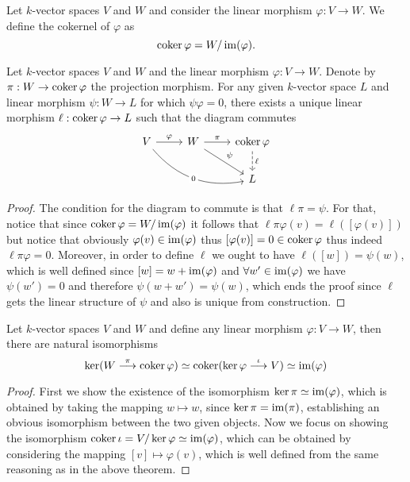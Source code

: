 \begin{definition}[Cokernel]
Let \(k\)-vector spaces \(V\) and \(W\) and consider the linear morphism
\(\varphi : V \to W\). We define the cokernel of \(\varphi\) as
\[
  \operatorname{coker} \varphi = W/\operatorname{im}(\varphi).
\]
\end{definition}

\begin{theorem}
Let \(k\)-vector spaces \(V\) and \(W\) and the linear morphism \(\varphi : V
\to W\). Denote by \(\pi : W \to \operatorname{coker} \varphi\) the projection morphism.
For any given \(k\)-vector space \(L\) and linear morphism \(\psi : W \to L\)
for which \(\psi  \varphi = 0\), there exists a unique linear
morphism \(\ell : \operatorname{coker} \varphi \to L\) such that the diagram commutes
\[
  \begin{tikzcd}
    V \ar[drr, bend right, "0" description] \ar[r, "\varphi"] &W \ar[r,
    "\pi"] \ar[dr, "\psi"] &\coker \varphi \ar[d, dashed, "\ell"]
    \\
    & &L
  \end{tikzcd}
\]
\end{theorem}

\begin{proof}
The condition for the diagram to commute is that \(\ell  \pi = \psi\).
For that, notice that since \(\operatorname{coker} \varphi = W/\operatorname{im}(\varphi)\) it follows
that \(\ell  \pi  \varphi (v) = \ell([\varphi(v)])\) but notice that
obviously \(\varphi(v) \in \operatorname{im}(\varphi)\) thus \([\varphi(v)] = 0 \in \operatorname{coker}
\varphi\) thus indeed \(\ell  \pi  \varphi = 0\). Moreover, in order
to define \(\ell\) we ought to have \(\ell([w]) = \psi(w)\), which is well
defined since \([w] = w + \operatorname{im}(\varphi)\) and \(\forall w' \in \operatorname{im}(\varphi)\)
we have \(\psi(w') = 0\) and therefore \(\psi(w + w') = \psi(w)\), which ends
the proof since \(\ell\) gets the linear structure of \(\psi\) and also is
unique from construction.
\end{proof}

\begin{proposition}
Let \(k\)-vector spaces \(V\) and \(W\) and define any linear morphism
\(\varphi : V \to W\), then there are natural isomorphisms
\[
  \ker(W \overset \pi \longrightarrow \operatorname{coker} \varphi) \simeq \operatorname{coker}(\ker \varphi
  \overset \iota \longrightarrow V) \simeq \operatorname{im}(\varphi)
\]
\end{proposition}

\begin{proof}
First we show the existence of the isomorphism \(\ker \pi \simeq \operatorname{im}(\varphi)\),
which is obtained by taking the mapping \(w \mapsto w\), since \(\ker \pi =
\operatorname{im}(\pi)\), establishing an obvious isomorphism between the two given objects.
Now we focus on showing the isomorphism \(\operatorname{coker} \iota = V/\ker \varphi \simeq
\operatorname{im}(\varphi)\), which can be obtained by considering the mapping \([v] \mapsto
\varphi(v)\), which is well defined from the same reasoning as in the above
theorem.
\end{proof}

